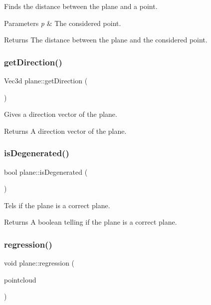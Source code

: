 Finds the distance between the plane and a point. 


\begin{DoxyParams}{Parameters}
{\em p} & The considered point. \\
\hline
\end{DoxyParams}
\begin{DoxyReturn}{Returns}
The distance between the plane and the considered point. 
\end{DoxyReturn}
\mbox{\label{classplane_ace51184307674051addc6211b04eb396}} 
\subsubsection{get\+Direction()}
{\footnotesize\ttfamily Vec3d plane\+::get\+Direction (\begin{DoxyParamCaption}{ }\end{DoxyParamCaption})}



Gives a direction vector of the plane. 

\begin{DoxyReturn}{Returns}
A direction vector of the plane. 
\end{DoxyReturn}
\mbox{\label{classplane_a09f0be78b9c809866bca9f9b744f046e}} 
\subsubsection{is\+Degenerated()}
{\footnotesize\ttfamily bool plane\+::is\+Degenerated (\begin{DoxyParamCaption}{ }\end{DoxyParamCaption})}



Tels if the plane is a correct plane. 

\begin{DoxyReturn}{Returns}
A boolean telling if the plane is a correct plane. 
\end{DoxyReturn}
\mbox{\label{classplane_add743551ece037c4918698a46db02bf7}} 
\subsubsection{regression()}
{\footnotesize\ttfamily void plane\+::regression (\begin{DoxyParamCaption}\item[{\textbf{ point3d\+Cloud}}]{pointcloud }\end{DoxyParamCaption})}



